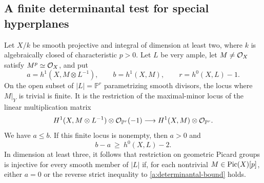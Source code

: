 \subsection{A finite determinantal test for special hyperplanes}

\begin{proposition}[A2D; Proved]\label{a:determinantal}
Let $X/k$ be smooth projective and integral of dimension at least two,
where $k$ is algebraically closed of characteristic $p>0$.
Let $L$ be very ample, let $M\ne\mathcal O_X$ satisfy $M^p\simeq\mathcal O_X$,
and put
\[
 a=h^1(X,M\otimes L^{-1}),\qquad b=h^1(X,M),\qquad
 r=h^0(X,L)-1.
\]
On the open subset of $|L|=\mathbb P^r$ parametrizing smooth divisors,
the locus where $M|_Y$ is trivial is finite. It is the restriction of
the maximal-minor locus of the linear multiplication matrix
\[
 H^1(X,M\otimes L^{-1})\otimes\mathcal O_{\mathbb P^r}(-1)
 \longrightarrow H^1(X,M)\otimes\mathcal O_{\mathbb P^r}.
\]
We have $a\leq b$. If this finite locus is nonempty, then $a>0$ and
\begin{equation}\label{a:determinantal-bound}
 b-a\ \geq\ h^0(X,L)-2.
\end{equation}
In dimension at least three, it follows that restriction on geometric
Picard groups is injective for every smooth member of $|L|$ if, for
each nontrivial $M\in\operatorname{Pic}(X)[p]$, either $a=0$ or the reverse strict
inequality to \eqref{a:determinantal-bound} holds.
\end{proposition}

